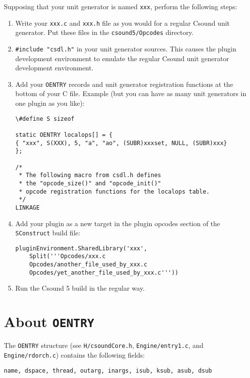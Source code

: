 \documentclass[10pt,letterpaper,onecolumn]{book}
\begin{document}
Supposing that your unit generator is named \texttt{xxx}, perform the following steps:
\begin{enumerate}
\item Write your \texttt{xxx.c} and \texttt{xxx.h} file as you would for a regular Csound unit generator. Put these files in the \texttt{csound5/Opcodes} directory.
\item \texttt{\#include "csdl.h"} in your unit generator sources. This causes the plugin development environment to emulate the regular Csound unit generator development environment.
\item Add your \texttt{OENTRY} records and unit generator registration functions at the bottom of your C file. Example (but you can have as many unit generators in one plugin as you like):
\begin{lstlisting}
\#define S sizeof

static OENTRY localops[] = {
{ "xxx", S(XXX), 5, "a", "ao", (SUBR)xxxset, NULL, (SUBR)xxx}
};

/*
 * The following macro from csdl.h defines 
 * the "opcode_size()" and "opcode_init()" 
 * opcode registration functions for the localops table.
 */
LINKAGE
\end{lstlisting}
\item Add your plugin as a new target in the plugin opcodes section of the \texttt{SConstruct} build file:
\begin{lstlisting}
pluginEnvironment.SharedLibrary('xxx', 
    Split('''Opcodes/xxx.c 
    Opcodes/another_file_used_by_xxx.c 
    Opcodes/yet_another_file_used_by_xxx.c'''))
\end{lstlisting}
\item Run the Csound 5 build in the regular way.
\end{enumerate}		

\section{About \texttt{OENTRY}}

The \texttt{OENTRY} structure (see \texttt{H/csoundCore.h}, \texttt{Engine/entry1.c}, and \texttt{Engine/rdorch.c}) contains the following fields:

\begin{lstlisting}
name, dspace, thread, outarg, inargs, isub, ksub, asub, dsub
\end{lstlisting}
\end{document}
